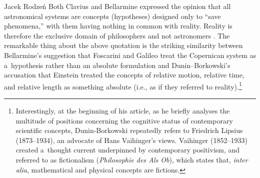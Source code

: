 \begin{artengenv}{Jacek Rodzeń}
Both Clavius and Bellarmine expressed the opinion that all astronomical systems are concepts (hypotheses) designed only to ``save phenomena,'' with them having nothing in common with reality. Reality is therefore the exclusive domain of philosophers and not astronomers
\parencite[][p.158]{numbers_catholicism_1986}. %
 The remarkable thing about the above quotation is the striking similarity between Bellarmine's suggestion that Foscarini and Galileo treat the Copernican system as a~hypothesis rather than an absolute formulation and Dunin–Borkowski's accusation that Einstein treated the concepts of relative motion, relative time, and relative length as something absolute (i.e., as if they referred to reality).\footnote{Interestingly, at the beginning of his article, as he briefly analyses the multitude of positions concerning the cognitive status of contemporary scientific concepts, Dunin-Borkowski repeatedly refers to Friedrich Lipsius (1873--1934), an advocate of Hans Vaihinger's views. Vaihinger (1852--1933) created a~thought current underpinned by contemporary positivism, and referred to as fictionalism (\textit{Philosophie des Als Ob}), which states that, \textit{inter alia}, mathematical and physical concepts are fictions.}


\end{artengenv}

